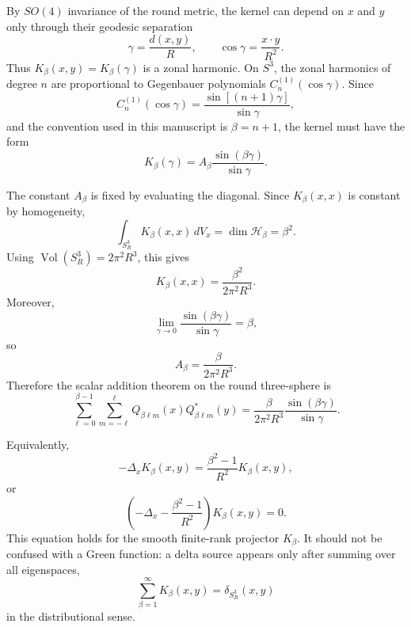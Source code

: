 \documentclass[aps,prd,onecolumn,superscriptaddress,longbibliography,nofootinbib,notitlepage]{revtex4-2}
\begin{document}
By $SO(4)$ invariance of the round metric, the kernel can depend on $x$ and $y$
only through their geodesic separation
\begin{equation}
  \gamma=\frac{d(x,y)}{R},
  \qquad
  \cos\gamma=\frac{x\cdot y}{R^2}.
\end{equation}
Thus $K_\beta(x,y)=K_\beta(\gamma)$ is a zonal harmonic. On $S^3$, the zonal
harmonics of degree $n$ are proportional to Gegenbauer polynomials
$C_n^{(1)}(\cos\gamma)$. Since
\begin{equation}
  C_n^{(1)}(\cos\gamma)
  =
  \frac{\sin[(n+1)\gamma]}{\sin\gamma},
\end{equation}
and the convention used in this manuscript is $\beta=n+1$, the kernel must have
the form
\begin{equation}
  K_\beta(\gamma)
  =
  A_\beta
  \frac{\sin(\beta\gamma)}{\sin\gamma}.
\end{equation}

The constant $A_\beta$ is fixed by evaluating the diagonal. Since $K_\beta(x,x)$
is constant by homogeneity,
\begin{equation}
  \int_{S^3_R}K_\beta(x,x)\,dV_x
  =
  \dim\mathcal H_\beta
  =
  \beta^2 .
\end{equation}
Using $\operatorname{Vol}(S^3_R)=2\pi^2R^3$, this gives
\begin{equation}
  K_\beta(x,x)=\frac{\beta^2}{2\pi^2R^3}.
\end{equation}
Moreover,
\begin{equation}
  \lim_{\gamma\to0}
  \frac{\sin(\beta\gamma)}{\sin\gamma}
  =
  \beta,
\end{equation}
so
\begin{equation}
  A_\beta=\frac{\beta}{2\pi^2R^3}.
\end{equation}
Therefore the scalar addition theorem on the round three-sphere is
\begin{equation}
  \boxed{
  \sum_{\ell=0}^{\beta-1}
  \sum_{m=-\ell}^{\ell}
  Q_{\beta\ell m}(x)Q^*_{\beta\ell m}(y)
  =
  \frac{\beta}{2\pi^2R^3}
  \frac{\sin(\beta\gamma)}{\sin\gamma}
  } .
\end{equation}

Equivalently,
\begin{equation}
  -\Delta_x K_\beta(x,y)
  =
  \frac{\beta^2-1}{R^2}K_\beta(x,y),
\end{equation}
or
\begin{equation}
  \left(-\Delta_x-\frac{\beta^2-1}{R^2}\right)K_\beta(x,y)=0.
\end{equation}
This equation holds for the smooth finite-rank projector $K_\beta$. It should not
be confused with a Green function: a delta source appears only after summing over
all eigenspaces,
\begin{equation}
  \sum_{\beta=1}^{\infty}K_\beta(x,y)
  =
  \delta_{S^3_R}(x,y)
\end{equation}
in the distributional sense.
\end{document}
